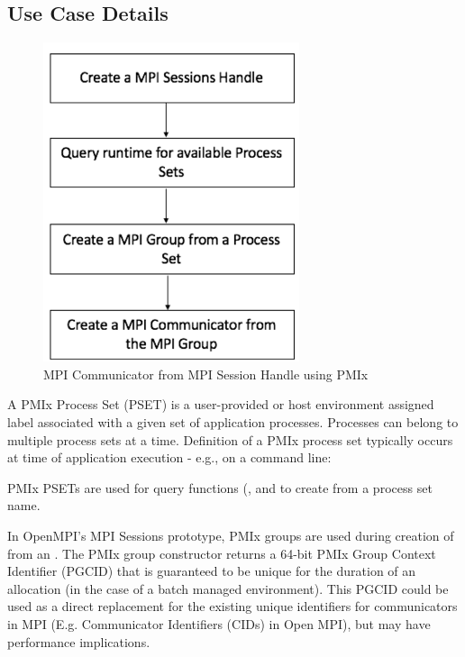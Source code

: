 \subsection{Use Case Details}

\begingroup
\begin{figure}
  \begin{center}
    \includegraphics[width=.5\textwidth,keepaspectratio]{figs/mpi-sessions1}
  \end{center}
  \caption{MPI Communicator from MPI Session Handle using PMIx}
  \label{fig:mpi_s1}
\end{figure}
\endgroup

A PMIx Process Set (PSET) is a user-provided or host environment assigned
label associated with a given set of application processes. Processes can
belong to multiple process sets at a time. Definition of a PMIx
process set typically occurs at time of application execution - e.g., on a
command line: 

PMIx PSETs are used for query functions (,  and to create  from a process set name.

In OpenMPI's MPI Sessions prototype, PMIx groups are used during creation of  from an . The PMIx group constructor returns a 64-bit PMIx Group Context Identifier (PGCID) that is guaranteed to be unique for the duration of an allocation (in the case of a batch managed environment). This PGCID could be used as a direct replacement for the existing unique identifiers for communicators in MPI (E.g. Communicator Identifiers (CIDs) in Open MPI), but may have performance implications.

